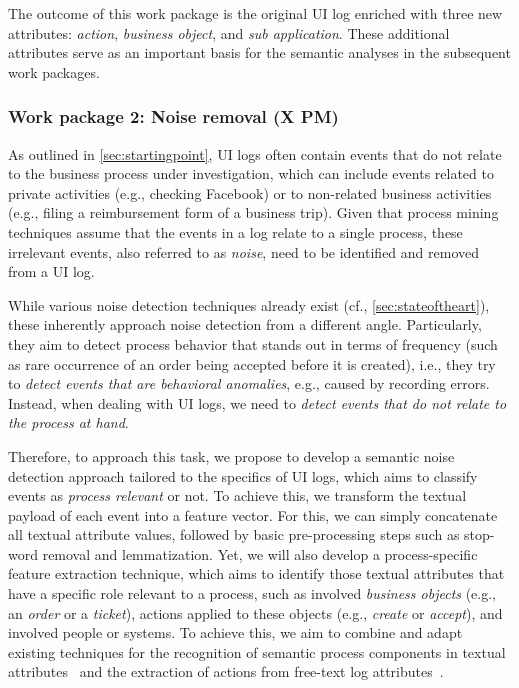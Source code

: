  The outcome of this work package is the original UI log enriched with three new attributes: \textit{action}, \textit{business object}, and \textit{sub application}. These additional attributes serve as an important basis for the semantic analyses in the subsequent work packages.  


\subsubsection{Work package 2:  Noise removal (X PM)}
\label{sec:wp2}

As outlined in \autoref{sec:startingpoint}, UI logs often contain events that do not relate to the business process under investigation, which can include events related to private activities (e.g., checking Facebook) or to non-related business activities (e.g., filing a reimbursement form of a business trip).
Given that process mining techniques assume that the events in a log relate to a single process, these irrelevant events, also referred to as \emph{noise}, need to be identified and removed from a UI log.

While various noise detection techniques already exist (cf., \autoref{sec:stateoftheart}), these  inherently approach noise detection from a different angle. Particularly, they aim to detect process behavior that stands out in terms of frequency (such as rare occurrence of an order being accepted before it is created), i.e., they try to \emph{detect events that are behavioral anomalies}, e.g., caused by recording errors.
Instead, when dealing with UI logs, we need to \emph{detect events that do not relate to the process at hand}. 

Therefore, to approach this task, we propose to develop a semantic noise detection approach tailored to the specifics of UI logs, which aims to classify events as \emph{process relevant} or not. 
To achieve this, we transform the textual payload of each event into a feature vector.
For this, we can simply concatenate all textual attribute values, followed by basic pre-processing steps such as stop-word removal and lemmatization. Yet, we will also develop a process-specific feature extraction technique, which aims to identify those textual attributes that have a specific role relevant to a process, such as involved \emph{business objects} (e.g., an \emph{order} or a \emph{ticket}), actions applied to these objects (e.g., \emph{create} or \emph{accept}), and involved people or systems. To achieve this, we aim to combine and adapt existing techniques for the recognition of semantic process components in textual attributes~\cite{rebmann2021extracting} and the extraction of actions from free-text log attributes~\cite{gupta2020analyzing}. 

